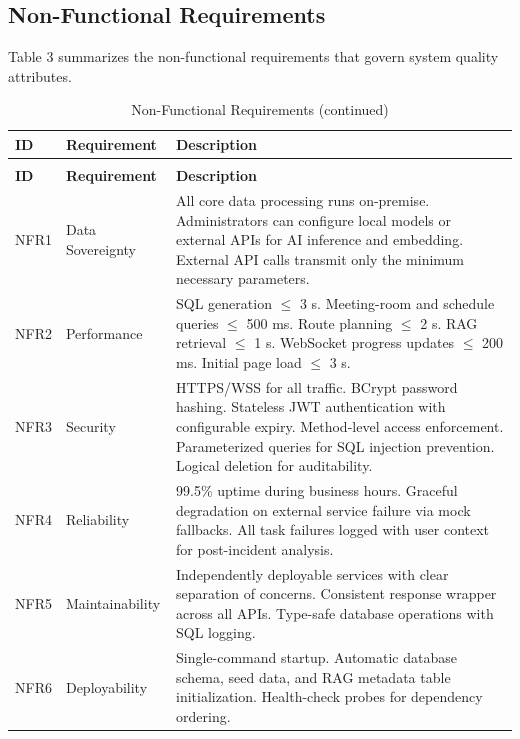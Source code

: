 \subsection{Non-Functional Requirements}

Table 3 summarizes the non-functional requirements that govern system quality attributes.

{\small\singlespacing
\begin{longtable}{p{}p{}p{}}
\caption{Non-Functional Requirements}
\label{tab:nfr}
\\
\toprule
\textbf{ID} & \textbf{Requirement} & \textbf{Description} \\
\midrule
\endfirsthead
\caption[]{Non-Functional Requirements (continued)} \\
\toprule
\textbf{ID} & \textbf{Requirement} & \textbf{Description} \\
\midrule
\endhead
\endfoot
NFR1 & Data Sovereignty & All core data processing runs on-premise. Administrators can configure local models or external APIs for AI inference and embedding. External API calls transmit only the minimum necessary parameters. \\
\addlinespace
NFR2 & Performance & SQL generation $\leq$ 3 s. Meeting-room and schedule queries $\leq$ 500 ms. Route planning $\leq$ 2 s. RAG retrieval $\leq$ 1 s. WebSocket progress updates $\leq$ 200 ms. Initial page load $\leq$ 3 s. \\
\addlinespace
NFR3 & Security & HTTPS/WSS for all traffic. BCrypt password hashing. Stateless JWT authentication with configurable expiry. Method-level access enforcement. Parameterized queries for SQL injection prevention. Logical deletion for auditability. \\
\addlinespace
NFR4 & Reliability & 99.5\% uptime during business hours. Graceful degradation on external service failure via mock fallbacks. All task failures logged with user context for post-incident analysis. \\
\addlinespace
NFR5 & Maintainability & Independently deployable services with clear separation of concerns. Consistent response wrapper across all APIs. Type-safe database operations with SQL logging. \\
\addlinespace
NFR6 & Deployability & Single-command startup. Automatic database schema, seed data, and RAG metadata table initialization. Health-check probes for dependency ordering. \\
\bottomrule
\end{longtable}
}

